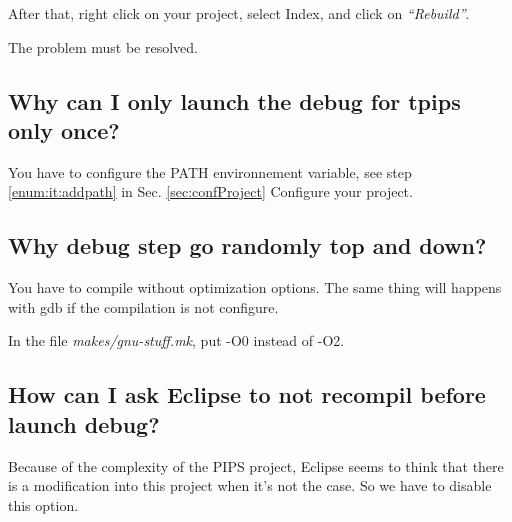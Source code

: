 \documentclass[a4paper]{article}
\begin{document}
After that, right click on your project, select Index, and click on \emph{``Rebuild''}.

The problem must be resolved.


\subsection{Why can I only launch the debug for tpips only once?}

You have to configure the PATH environnement variable, see step \ref{enum:it:addpath} in Sec. \ref{sec:confProject} Configure your project.

% 
% 


\subsection{Why debug step go randomly top and down?}
\label{sec:faq:randomdebug}

You have to compile without optimization options. The same thing will happens with gdb if the compilation is not configure.

In the file \emph{makes/gnu-stuff.mk}, put -O0 instead of -O2.



\subsection{How can I ask Eclipse to not recompil before launch debug?}

Because of the complexity of the PIPS project, Eclipse seems to think that there is a modification into this project when it's not the case.
So we have to disable this option.
\end{document}
